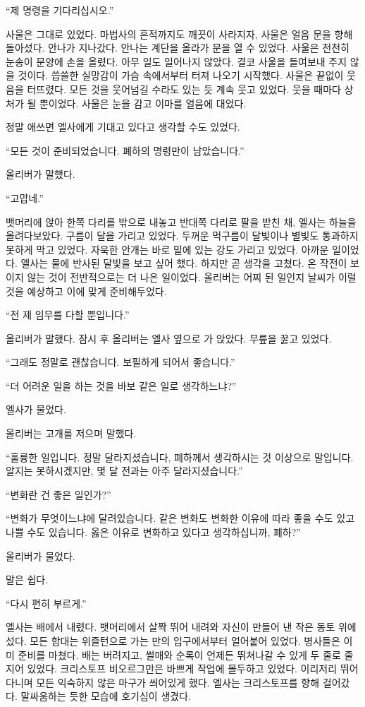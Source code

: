 ``제 명령을 기다리십시오.''

사울은 그대로 있었다. 마법사의 흔적까지도 깨끗이 사라지자, 사울은 얼음 문을 향해 돌아섰다. 안나가 지나갔다. 안나는 계단을 올라가 문을 열 수 있었다. 사울은 천천히 눈송이 문양에 손을 올렸다. 아무 일도 일어나지 않았다. 결코 사울을 들여보내 주지 않을 것이다. 씁쓸한 실망감이 가슴 속에서부터 터져 나오기 시작했다. 사울은 끝없이 웃음을 터뜨렸다. 모든 것을 웃어넘길 수라도 있는 듯 계속 웃고 있었다. 웃을 때마다 상처가 될 뿐이었다. 사울은 눈을 감고 이마를 얼음에 대었다.

정말 애쓰면 엘사에게 기대고 있다고 생각할 수도 있었다.

\textbreak

\forceindent``모든 것이 준비되었습니다. 폐하의 명령만이 남았습니다.''

올리버가 말했다.

``고맙네.''

뱃머리에 앉아 한쪽 다리를 밖으로 내놓고 반대쪽 다리로 팔을 받친 채, 엘사는 하늘을 올려다보았다. 구름이 달을 가리고 있었다. 두꺼운 먹구름이 달빛이나 별빛도 통과하지 못하게 막고 있었다. 자욱한 안개는 바로 밑에 있는 강도 가리고 있었다. 아까운 일이었다. 엘사는 물에 반사된 달빛을 보고 싶어 했다. 하지만 곧 생각을 고쳤다. 온 작전이 보이지 않는 것이 전반적으로는 더 나은 일이었다. 올리버는 어찌 된 일인지 날씨가 이럴 것을 예상하고 이에 맞게 준비해두었다.

``전 제 임무를 다할 뿐입니다.''

올리버가 말했다. 잠시 후 올리버는 엘사 옆으로 가 앉았다. 무릎을 꿇고 있었다.

``그래도 정말로 괜찮습니다. 보필하게 되어서 좋습니다.''

``더 어려운 일을 하는 것을 바보 같은 일로 생각하느냐?''

엘사가 물었다.

올리버는 고개를 저으며 말했다.

``훌륭한 일입니다. 정말 달라지셨습니다, 폐하께서 생각하시는 것 이상으로 말입니다. 알지는 못하시겠지만, 몇 달 전과는 아주 달라지셨습니다.''

``변화란 건 좋은 일인가?''

``변화가 무엇이느냐에 달려있습니다. 같은 변화도 변화한 이유에 따라 좋을 수도 있고 나쁠 수도 있습니다. 옳은 이유로 변화하고 있다고 생각하십니까, 폐하?''

올리버가 물었다.

말은 쉽다.

`` 다시 편히 부르게.''

엘사는 배에서 내렸다. 뱃머리에서 살짝 뛰어 내려와 자신이 만들어 낸 작은 동토 위에 섰다. 모든 함대는 위즐턴으로 가는 만의 입구에서부터 얼어붙어 있었다. 병사들은 이미 준비를 마쳤다. 배는 버려지고, 썰매와 순록이 언제든 뛰쳐나갈 수 있게 두 줄로 줄지어 있었다. 크리스토프 비오르그만은 바쁘게 작업에 몰두하고 있었다. 이리저리 뛰어다니며 모든 익숙하지 않은 마구가 씌어있게 했다. 엘사는 크리스토프를 향해 걸어갔다. 말싸움하는 듯한 모습에 호기심이 생겼다.

